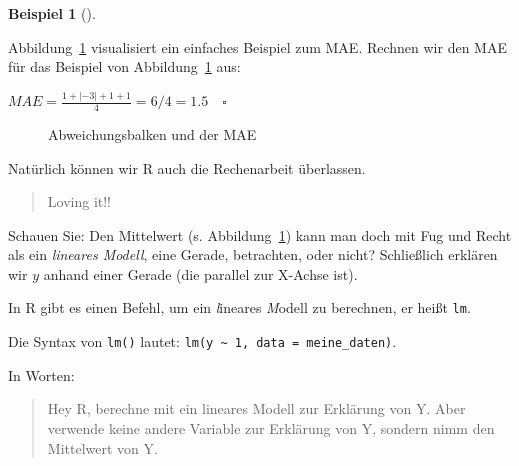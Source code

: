\documentclass[
  letterpaper,
]{scrbook}
\theoremstyle{definition}
\theoremstyle{definition}
\newtheorem{example}{Beispiel}[chapter]
\theoremstyle{definition}
\theoremstyle{remark}
\begin{document}
\begin{example}[]\protect\hypertarget{exm-mae}{}\label{exm-mae}

Abbildung~\ref{fig-mae} visualisiert ein einfaches Beispiel zum MAE.
Rechnen wir den MAE für das Beispiel von Abbildung~\ref{fig-mae} aus:

\(MAE = \frac{1 + |- 3| + 1 + 1}{4} = 6/4 = 1.5 \quad \square\)

\end{example}

\begin{figure}


\caption{\label{fig-mae}Abweichungsbalken und der MAE}

\end{figure}%

Natürlich können wir R auch die Rechenarbeit überlassen.

\begin{quote}
{} Loving it!!
\end{quote}

Schauen Sie: Den Mittelwert (s. Abbildung~\ref{fig-mae}) kann man doch
mit Fug und Recht als ein \emph{lineares Modell}, eine Gerade,
betrachten, oder nicht? Schließlich erklären wir \(y\) anhand einer
Gerade (die parallel zur X-Achse ist).

In R gibt es einen Befehl, um ein \emph{l}ineares \emph{M}odell zu
berechnen, er heißt \texttt{lm}.

Die Syntax von \texttt{lm()} lautet:
\texttt{lm(y\ \textasciitilde{}\ 1,\ data\ =\ meine\_daten)}.

In Worten:

\begin{quote}
Hey R, berechne mit ein lineares Modell zur Erklärung von Y. Aber
verwende keine andere Variable zur Erklärung von Y, sondern nimm den
Mittelwert von Y.
\end{quote}
\end{document}
